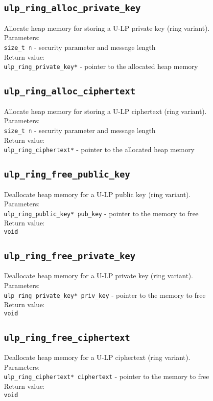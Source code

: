 \documentclass[10pt,a4paper]{article}
\begin{document}
\subsection*{\texttt{ulp\_ring\_alloc\_private\_key}}
Allocate heap memory for storing a U-LP private key (ring variant).\\
Parameters:\\
\texttt{size\_t n} - security parameter and message length\\
Return value:\\
\texttt{ulp\_ring\_private\_key*} - pointer to the allocated heap memory

\subsection*{\texttt{ulp\_ring\_alloc\_ciphertext}}
Allocate heap memory for storing a U-LP ciphertext (ring variant).\\
Parameters:\\
\texttt{size\_t n} - security parameter and message length\\
Return value:\\
\texttt{ulp\_ring\_ciphertext*} - pointer to the allocated heap memory

\subsection*{\texttt{ulp\_ring\_free\_public\_key}}
Deallocate heap memory for a U-LP public key (ring variant).\\
Parameters:\\
\texttt{ulp\_ring\_public\_key* pub\_key} - pointer to the memory to free\\
Return value:\\
\texttt{void}

\subsection*{\texttt{ulp\_ring\_free\_private\_key}}
Deallocate heap memory for a U-LP private key (ring variant).\\
Parameters:\\
\texttt{ulp\_ring\_private\_key* priv\_key} - pointer to the memory to free\\
Return value:\\
\texttt{void}

\subsection*{\texttt{ulp\_ring\_free\_ciphertext}}
Deallocate heap memory for a U-LP ciphertext (ring variant).\\
Parameters:\\
\texttt{ulp\_ring\_ciphertext* ciphertext} - pointer to the memory to free\\
Return value:\\
\texttt{void}
\end{document}
